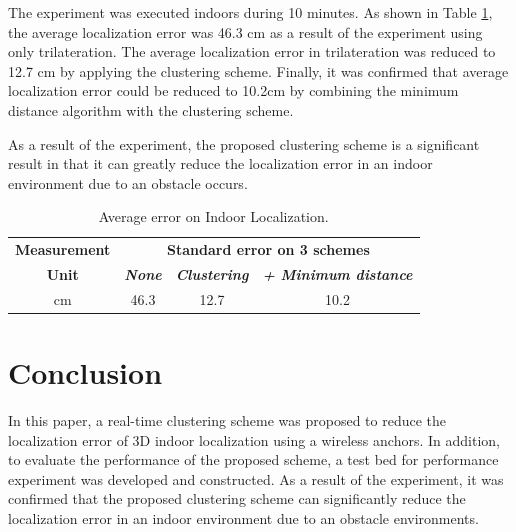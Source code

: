 \documentclass[conference]{IEEEtran}
\begin{document}
The experiment was executed indoors during 10 minutes. As shown in Table \ref{tab1}, the average localization error was 46.3 cm as a result of the experiment using only trilateration. The average localization error in trilateration was reduced to 12.7 cm by applying the clustering scheme. Finally, it was confirmed that average localization error could be reduced to 10.2cm by combining the minimum distance algorithm with the clustering scheme.

As a result of the experiment, the proposed clustering scheme is a significant result in that it can greatly reduce the localization error in an indoor environment due to an obstacle occurs.


\begin{table}[htbp]
    \caption{Average error on Indoor Localization.}
    \begin{center}
        \begin{tabular}{|c|c|c|c|}
            \hline
            \textbf{Measurement} & \multicolumn{3}{|c|}{\textbf{Standard error on 3 schemes}}                                                                       \\
            \cline{2-4}
            \textbf{Unit}        & \textbf{\textit{None}}                                     & \textbf{\textit{Clustering}} & \textbf{\textit{+ Minimum distance}} \\
            \hline
            cm                   & 46.3                                                       & 12.7                         & 10.2                                 \\
            \hline
        \end{tabular}
        \label{tab1}
    \end{center}
\end{table}


\section{Conclusion}

In this paper, a real-time clustering scheme was proposed to reduce the localization error of 3D indoor localization using a wireless anchors. In addition, to evaluate the performance of the proposed scheme, a test bed for performance experiment was developed and constructed. As a result of the experiment, it was confirmed that the proposed clustering scheme can significantly reduce the localization error in an indoor environment due to an obstacle environments.
\end{document}
